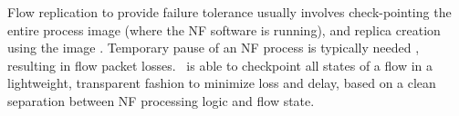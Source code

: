 Flow replication to provide failure tolerance usually involves check-pointing the entire process image (where the NF software is running), and replica creation using the image \cite{sherry2015rollback} \cite{rajagopalan2013pico}. Temporary pause of an NF process is typically needed \cite{sherry2015rollback}, resulting in flow packet losses.
\nfactor~is able to checkpoint all states of a flow in a lightweight, transparent fashion to minimize loss and delay, based on a clean separation between NF processing logic and flow state. %







